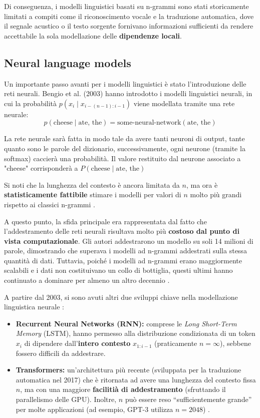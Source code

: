 Di conseguenza, i modelli linguistici basati su n-grammi sono stati storicamente limitati a compiti come il riconoscimento vocale e la traduzione automatica, dove il segnale acustico o il testo sorgente fornivano informazioni sufficienti da rendere accettabile la sola modellazione delle \textbf{dipendenze locali}.

\subsection{Neural language models}

Un importante passo avanti per i modelli linguistici è stato l'introduzione delle reti neurali. Bengio et al. (2003) hanno introdotto i modelli linguistici neurali, in cui la probabilità $p(x_i \mid x_{i-(n-1):i-1})$ viene modellata tramite una rete neurale:
\[
p(\text{cheese} \mid \text{ate, the}) = \text{some-neural-network}(\text{ate, the})
\]

La rete neurale sarà fatta in modo tale da avere tanti neuroni di output, tante quanto sono le parole del dizionario, successivamente, ogni neurone (tramite la softmax) caccierà
una probabilità.
Il valore restituito dal neurone associato a "cheese" corrisponderà a $P(\text{cheese} \mid \text{ate, the})$

Si noti che la lunghezza del contesto è ancora limitata da $n$, ma ora è \textbf{statisticamente fattibile} stimare i modelli per valori di $n$ molto più grandi rispetto ai classici n-grammi .

A questo punto, la sfida principale era rappresentata dal fatto che l'addestramento delle reti neurali risultava molto più \textbf{costoso dal punto di vista computazionale}. Gli autori addestrarono un modello su soli 14 milioni di parole, dimostrando che superava i modelli ad n-grammi addestrati sulla stessa quantità di dati. Tuttavia, poiché i modelli ad n-grammi erano maggiormente scalabili e i dati non costituivano un collo di bottiglia, questi ultimi hanno continuato a dominare per almeno un altro decennio .

A partire dal 2003, si sono avuti altri due sviluppi chiave nella modellazione linguistica neurale :

\begin{itemize}
    \item \textbf{Recurrent Neural Networks (RNN):} comprese le \textit{Long Short-Term Memory} (LSTM), hanno permesso alla distribuzione condizionata di un token $x_i$ di dipendere dall'\textbf{intero contesto} $x_{1:i-1}$ (praticamente $n = \infty$), sebbene fossero difficili da addestrare.
    
    \item \textbf{Transformers:} un'architettura più recente (sviluppata per la traduzione automatica nel 2017) che è ritornata ad avere una lunghezza del contesto fissa $n$, ma con una maggiore \textbf{facilitià di addestramento} (sfruttando il parallelismo delle GPU). Inoltre, $n$ può essere reso ``sufficientemente grande'' per molte applicazioni (ad esempio, GPT-3 utilizza $n = 2048$) .
\end{itemize}




\newpage

